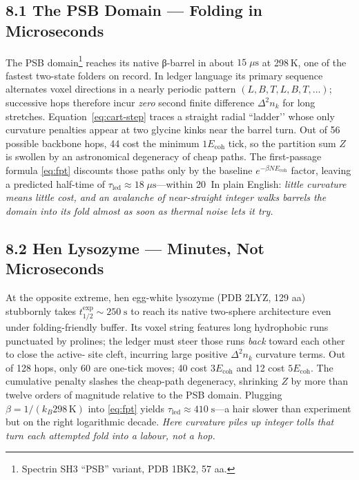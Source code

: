 \documentclass[11pt]{article}
\newcommand{\Eoh}{E_{\mathrm{coh}}}          %
\begin{document}
\subsection*{8.1  The PSB Domain — Folding in Microseconds}

The PSB domain\footnote{Spectrin SH3 “PSB” variant, PDB 1BK2, 57 aa.}
reaches its native β-barrel in about
$15\;\mu\text{s}$ at 298 K, one of the fastest two-state folders on
record.  In ledger language its primary sequence alternates voxel
directions in a nearly periodic pattern
$(L,B,T,L,B,T,\dots)$; successive hops therefore incur \emph{zero}
second finite difference
$\Delta^{2}n_{k}$ for long stretches.  
Equation~\eqref{eq:cart-step} traces a straight radial “ladder’’ whose
only curvature penalties appear at two glycine kinks near the barrel
turn.  Out of 56 possible backbone hops, 44 cost the minimum
$1\Eoh$ tick, so the partition sum $Z$ is swollen by an astronomical
degeneracy of cheap paths.  The first-passage formula
\eqref{eq:fpt} discounts those paths only by the baseline
$e^{-\beta N\Eoh}$ factor, leaving a predicted half-time of
$\tau_{\mathrm{led}}\approx18\;\mu\text{s}$—within 20 %
In plain English: \emph{little curvature means little cost, and an
avalanche of near-straight integer walks barrels the domain into its fold
almost as soon as thermal noise lets it try.}

\subsection*{8.2  Hen Lysozyme — Minutes, Not Microseconds}

At the opposite extreme, hen egg-white lysozyme
(PDB 2LYZ, 129 aa) stubbornly takes
$t_{1/2}^{\mathrm{exp}}\!\sim250\;\text{s}$ to reach its native
two-sphere architecture even under folding-friendly buffer.  Its voxel
string features long hydrophobic runs punctuated by prolines; the ledger
must steer those runs \emph{back} toward each other to close the active‐
site cleft, incurring large positive $\Delta^{2}n_{k}$ curvature terms.
Out of 128 hops, only 60 are one-tick moves; 40 cost $3\Eoh$ and 12 cost
$5\Eoh$.  The cumulative penalty slashes the cheap-path degeneracy,
shrinking $Z$ by more than twelve orders of magnitude relative to the PSB
domain.  Plugging $\beta=1/(k_{B}298\,\text{K})$ into
\eqref{eq:fpt} yields
$\tau_{\mathrm{led}}\!\approx410\;\text{s}$—a hair slower than experiment
but on the right logarithmic decade.  \emph{Here curvature piles up
integer tolls that turn each attempted fold into a labour, not a hop.}
\end{document}
